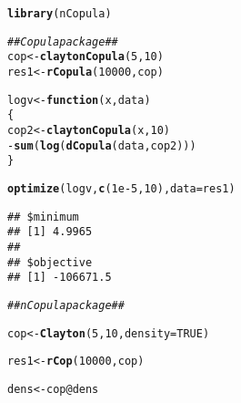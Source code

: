 \documentclass[11pt, english]{article}\usepackage[]{graphicx}\usepackage[]{color}
\makeatletter
\newcommand{\hlnum}[1]{\textcolor[rgb]{0.686,0.059,0.569}{#1}}%
\newcommand{\hlcom}[1]{\textcolor[rgb]{0.678,0.584,0.686}{\textit{#1}}}%
\newcommand{\hlopt}[1]{\textcolor[rgb]{0,0,0}{#1}}%
\newcommand{\hlstd}[1]{\textcolor[rgb]{0.345,0.345,0.345}{#1}}%
\newcommand{\hlkwa}[1]{\textcolor[rgb]{0.161,0.373,0.58}{\textbf{#1}}}%
\newcommand{\hlkwb}[1]{\textcolor[rgb]{0.69,0.353,0.396}{#1}}%
\newcommand{\hlkwc}[1]{\textcolor[rgb]{0.333,0.667,0.333}{#1}}%
\newcommand{\hlkwd}[1]{\textcolor[rgb]{0.737,0.353,0.396}{\textbf{#1}}}%
\newenvironment{kframe}{%
 \def\at@end@of@kframe{}%
 \ifinner\ifhmode%
  \def\at@end@of@kframe{\end{minipage}}%
  \begin{minipage}{\columnwidth}%
 \fi\fi%
 \def\FrameCommand##1{\hskip\@totalleftmargin \hskip-\fboxsep
 \colorbox{shadecolor}{##1}\hskip-\fboxsep
     \hskip-\linewidth \hskip-\@totalleftmargin \hskip\columnwidth}%
 \MakeFramed {\advance\hsize-\width
   \@totalleftmargin\z@ \linewidth\hsize
   \@setminipage}}%
 {\par\unskip\endMakeFramed%
 \at@end@of@kframe}
\newenvironment{knitrout}{}{} %
\makeatother
\begin{document}
\begin{knitrout}
\color{fgcolor}\begin{kframe}
\begin{alltt}
\hlkwd{library}\hlstd{(nCopula)}
\end{alltt}


{\ttfamily\noindent\itshape\color{messagecolor}{\#\# Loading required package: copula}}

{\ttfamily\noindent\color{warningcolor}{\#\# Warning: package 'copula' was built under R version 3.3.2}}\begin{alltt}
\hlcom{## Copula package ##}
\hlstd{cop} \hlkwb{<-} \hlkwd{claytonCopula}\hlstd{(}\hlnum{5}\hlstd{,} \hlnum{10}\hlstd{)}
\hlstd{res1} \hlkwb{<-} \hlkwd{rCopula}\hlstd{(}\hlnum{10000}\hlstd{, cop)}

\hlstd{logv} \hlkwb{<-} \hlkwa{function}\hlstd{(}\hlkwc{x}\hlstd{,} \hlkwc{data}\hlstd{)}
\hlstd{\{}
  \hlstd{cop2} \hlkwb{<-} \hlkwd{claytonCopula}\hlstd{(x,} \hlnum{10}\hlstd{)}
  \hlopt{-}\hlkwd{sum}\hlstd{(}\hlkwd{log}\hlstd{(}\hlkwd{dCopula}\hlstd{(data, cop2)))}
\hlstd{\}}

\hlkwd{optimize}\hlstd{(logv,} \hlkwd{c}\hlstd{(}\hlnum{1e-5}\hlstd{,} \hlnum{10}\hlstd{),} \hlkwc{data} \hlstd{= res1)}
\end{alltt}
\begin{verbatim}
## $minimum
## [1] 4.9965
## 
## $objective
## [1] -106671.5
\end{verbatim}
\begin{alltt}
\hlcom{## nCopula package ##}

\hlstd{cop} \hlkwb{<-} \hlkwd{Clayton}\hlstd{(}\hlnum{5}\hlstd{,} \hlnum{10}\hlstd{,} \hlkwc{density} \hlstd{=} \hlnum{TRUE}\hlstd{)}
\end{alltt}


{\ttfamily\noindent\bfseries\color{errorcolor}{\#\# Error: `replacement` must be a character vector}}\begin{alltt}
\hlstd{res1} \hlkwb{<-} \hlkwd{rCop}\hlstd{(}\hlnum{10000}\hlstd{, cop)}
\end{alltt}


{\ttfamily\noindent\bfseries{}}\begin{alltt}
\hlstd{dens} \hlkwb{<-} \hlstd{cop}\hlopt{@}\hlkwc{dens}
\end{alltt}



\end{kframe}
\end{knitrout}
\end{document}

